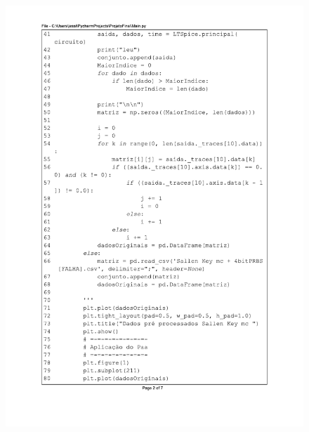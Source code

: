\begin{figure}[H]
\centering
\includegraphics[scale=0.9]{01_Pre_textuais/code/main2.pdf}
\end{figure}
